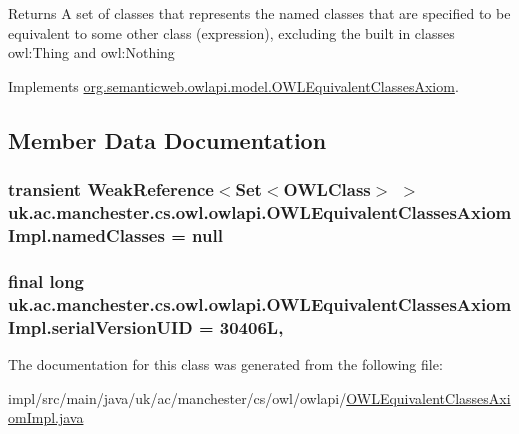 \begin{DoxyReturn}{Returns}
A set of classes that represents the named classes that are specified to be equivalent to some other class (expression), excluding the built in classes owl\-:Thing and owl\-:Nothing 
\end{DoxyReturn}


Implements \hyperlink{interfaceorg_1_1semanticweb_1_1owlapi_1_1model_1_1_o_w_l_equivalent_classes_axiom_a84edd9e7a5f363c3371a920e72d11439}{org.\-semanticweb.\-owlapi.\-model.\-O\-W\-L\-Equivalent\-Classes\-Axiom}.



\subsection{Member Data Documentation}
\hypertarget{classuk_1_1ac_1_1manchester_1_1cs_1_1owl_1_1owlapi_1_1_o_w_l_equivalent_classes_axiom_impl_a209cdbca0fcd3ddd46e44a076859eddb}{
\subsubsection[{named\-Classes}]{\setlength{\rightskip}{0pt plus 5cm}transient Weak\-Reference$<$Set$<${\bf O\-W\-L\-Class}$>$ $>$ uk.\-ac.\-manchester.\-cs.\-owl.\-owlapi.\-O\-W\-L\-Equivalent\-Classes\-Axiom\-Impl.\-named\-Classes = null\hspace{0.3cm}{\ttfamily [private]}}}\label{classuk_1_1ac_1_1manchester_1_1cs_1_1owl_1_1owlapi_1_1_o_w_l_equivalent_classes_axiom_impl_a209cdbca0fcd3ddd46e44a076859eddb}
\hypertarget{classuk_1_1ac_1_1manchester_1_1cs_1_1owl_1_1owlapi_1_1_o_w_l_equivalent_classes_axiom_impl_af725b73d344906942fe2101c87911fea}{
\subsubsection[{serial\-Version\-U\-I\-D}]{\setlength{\rightskip}{0pt plus 5cm}final long uk.\-ac.\-manchester.\-cs.\-owl.\-owlapi.\-O\-W\-L\-Equivalent\-Classes\-Axiom\-Impl.\-serial\-Version\-U\-I\-D = 30406\-L\hspace{0.3cm}{\ttfamily [static]}, {\ttfamily [private]}}}\label{classuk_1_1ac_1_1manchester_1_1cs_1_1owl_1_1owlapi_1_1_o_w_l_equivalent_classes_axiom_impl_af725b73d344906942fe2101c87911fea}


The documentation for this class was generated from the following file\-:\begin{DoxyCompactItemize}
\item 
impl/src/main/java/uk/ac/manchester/cs/owl/owlapi/\hyperlink{_o_w_l_equivalent_classes_axiom_impl_8java}{O\-W\-L\-Equivalent\-Classes\-Axiom\-Impl.\-java}\end{DoxyCompactItemize}
